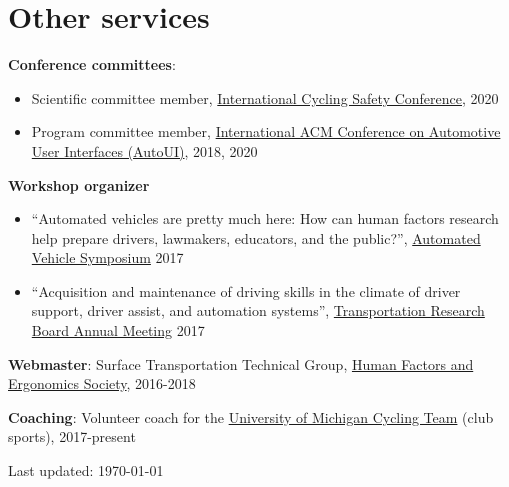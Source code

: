 \documentclass[11pt]{article}
\newenvironment{main}
{\begin{adjustwidth}{3em}{}}
{\end{adjustwidth}}
\begin{document}
\section*{Other services}
\begin{main}

\textbf{Conference committees}: 
\begin{itemize}
    \item Scientific committee member, \href{www.cyclingsafety.net}{International Cycling Safety Conference}, 2020
    \item Program committee member, \href{www.auto-ui.org}{International ACM Conference on Automotive User Interfaces (AutoUI)}, 2018, 2020
\end{itemize}

\textbf{Workshop organizer}
\begin{itemize}
    \item “Automated vehicles are pretty much here: How can human factors research help prepare drivers, lawmakers, educators, and the public?”, \href{www.automatedvehiclessymposium.org}{Automated Vehicle Symposium} 2017
    \item “Acquisition and maintenance of driving skills in the climate of driver support, driver assist, and automation systems”, \href{http://www.trb.org/AnnualMeeting/}{Transportation Research Board Annual Meeting} 2017
\end{itemize}

\textbf{Webmaster}: Surface Transportation Technical Group, \href{https://www.hfes.org/}{Human Factors and Ergonomics Society}, 2016-2018

\textbf{Coaching}: Volunteer coach for the \href{https://www.umcycling.org/}{University of Michigan Cycling Team} (club sports), 2017-present

\vfill\hfill
Last updated: \today

\end{main}
\end{document}
